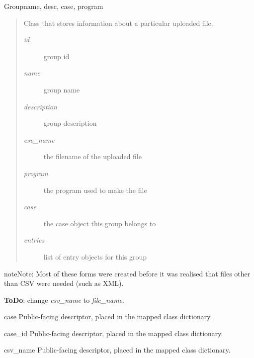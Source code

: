 \documentclass[letterpaper,10pt,english]{manual}
\begin{document}
\hypertarget{webscavator.model.models.Group}{}\begin{classdesc}{Group}{name, desc, case, program}~\begin{quote}

Class that stores information about a particular uploaded file.
\begin{description}
\item[\emph{id}    ]
group id

\item[\emph{name}]
group name

\item[\emph{description}]
group description

\item[\emph{csv\_name}]
the filename of the uploaded file

\item[\emph{program}]
the program used to make the file

\item[\emph{case}]
the case object this group belongs to

\item[\emph{entries}]
list of entry objects for this group

\end{description}
\end{quote}

\begin{notice}{note}{Note:}
Most of these forms were created before it was realised that files other than CSV were needed
(such as XML).

\textbf{ToDo}: change \emph{csv\_name} to \emph{file\_name}.
\end{notice}

\hypertarget{webscavator.model.models.Group.case}{}\begin{memberdesc}{case}
Public-facing descriptor, placed in the mapped class dictionary.
\end{memberdesc}

\hypertarget{webscavator.model.models.Group.case_id}{}\begin{memberdesc}{case\_id}
Public-facing descriptor, placed in the mapped class dictionary.
\end{memberdesc}

\hypertarget{webscavator.model.models.Group.csv_name}{}\begin{memberdesc}{csv\_name}
Public-facing descriptor, placed in the mapped class dictionary.
\end{memberdesc}


\end{classdesc}
\end{document}
